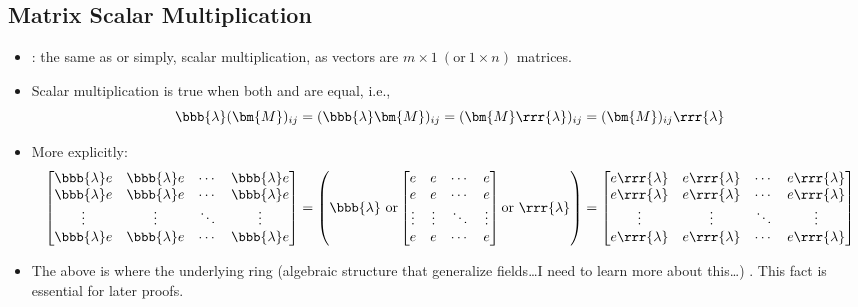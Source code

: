 \begin{itemize}
  \subsection{Matrix Scalar Multiplication}\label{Matrix Scalar Multiplication}
  \begin{itemize}
    \item {}: the same as \hyperref[Vector Scalar Multiplication]{} or simply, scalar multiplication, as vectors are \(m \times 1~(\text{or}~1 \times n)\) matrices.
    \item Scalar multiplication is true when both  and  are equal, i.e.,
    \[%
    \bbb{\lambda}(\bm{M})_{ij} = (\bbb{\lambda} \bm{M})_{ij} = ( \bm{M}\rrr{\lambda})_{ij}= (\bm{M})_{ij}\rrr{\lambda} %
    \]%
    \item More explicitly: 
    \[%
    \begin{bmatrix}
    \bbb{\lambda} e & \bbb{\lambda} e & \cdots & \bbb{\lambda} e \\
    \bbb{\lambda} e & \bbb{\lambda} e & \cdots & \bbb{\lambda} e \\
    \vdots & \vdots & \ddots & \vdots \\
    \bbb{\lambda} e & \bbb{\lambda} e & \cdots & \bbb{\lambda} e
    \end{bmatrix}
    =
    \left(
      \bbb{\lambda}~\text{or}
    \begin{bmatrix}
    e & e & \cdots & e \\
    e & e & \cdots & e \\
    \vdots & \vdots & \ddots & \vdots \\
    e & e & \cdots & e
    \end{bmatrix}
      \text{or}~\rrr{\lambda}
    \right)
    =
    \begin{bmatrix}
    e\rrr{\lambda} & e\rrr{\lambda} & \cdots & e\rrr{\lambda} \\
    e\rrr{\lambda} & e\rrr{\lambda} & \cdots & e\rrr{\lambda} \\
    \vdots & \vdots & \ddots & \vdots \\
    e\rrr{\lambda} & e\rrr{\lambda} & \cdots & e\rrr{\lambda}
    \end{bmatrix}
    \]%
    \item The above is  where the underlying ring (algebraic structure that generalize fields\dots I need to learn more about this\dots) . This fact is essential for later proofs.
  \end{itemize}
  

\end{itemize}
